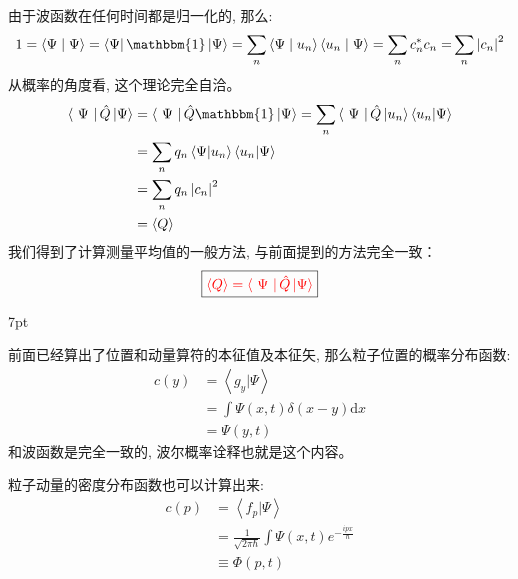 \documentclass[a4paper,zihao=-4,linespread=1]{ctexrep}
\newenvironment{thinknote}{%
\def\FrameCommand{%
\hspace{1pt}%
{\color{BurlyWood}\vrule width 2pt}%
{\color{formalshade}\vrule width 4pt}%
\colorbox{formalshade}%
}%
\MakeFramed{\advance\hsize-\width\FrameRestore}%
\noindent\hspace{-4.55pt}%
\begin{adjustwidth}{}{7pt}%
\vspace{2pt}\vspace{2pt}%
}
{%
\vspace{2pt}\end{adjustwidth}\endMakeFramed%
}
\begin{document}
    由于波函数在任何时间都是归一化的, 那么:
    \begin{equation*}
        1 = \left\langle {\Psi }
    \mathrel{\left | {\vphantom {\Psi  \Psi }}
    \right. \kern-\nulldelimiterspace}
    {\Psi } \right\rangle  = \left\langle \Psi  \right|\mathbbm{1}\left| \Psi  \right\rangle  = \sum\limits_n {\left\langle {\Psi }
    \mathrel{\left | {\vphantom {\Psi  {{u_n}}}}
    \right. \kern-\nulldelimiterspace}
    {{{u_n}}} \right\rangle \left\langle {{{u_n}}}
    \mathrel{\left | {\vphantom {{{u_n}} \Psi }}
    \right. \kern-\nulldelimiterspace}
    {\Psi } \right\rangle }  = \sum\limits_n {c_n^*{c_n} = } \sum\limits_n {{{\left| {{c_n}} \right|}^2}} 
    \end{equation*}
    从概率的角度看, 这个理论完全自洽。
    \begin{align*}
        \left\langle \Psi \right| \hat{Q}  \left| \Psi  \right\rangle & = \left\langle \Psi \right| \hat{Q} \mathbbm{1} \left| \Psi  \right\rangle = \sum_{n} \left\langle \Psi \right| \hat{Q} \left| u_n  \right \rangle\left \langle u_n  | \Psi  \right \rangle \\ 
        &=\sum_{n} q_n\left\langle  \Psi  |u_n  \right\rangle\left \langle u_n  | \Psi  \right \rangle\\
        &=\sum_{n} q_n\left| c_n \right| ^2\\
        &=\left\langle Q \right\rangle 
    \end{align*}
    我们得到了计算测量平均值的一般方法, 与前面提到的方法完全一致：
    \begin{equation}
        \label{eq:3.14}
        \boxed{\color{red}\left\langle Q \right\rangle=\left\langle \Psi \right| \hat{Q}  \left| \Psi  \right\rangle}
    \end{equation}
    \begin{thinknote}
        \setlength\parindent{2em}前面已经算出了位置和动量算符的本征值及本征矢, 那么粒子位置的概率分布函数:
        \begin{align*}
            c\left ( y \right ) & = \left \langle g_y| \Psi  \right \rangle \\& = \int \Psi \left ( x,t \right ) \delta(x-y)\mathrm{d}x
            \\&=\Psi \left ( y,t \right ) 
        \end{align*}
        和波函数是完全一致的, 波尔概率诠释也就是这个内容。

        \setlength\parindent{2em}粒子动量的密度分布函数也可以计算出来:
        \begin{align*}
            c\left ( p \right ) & = \left \langle f_p  | \Psi  \right \rangle \\ & = \frac{1}{\sqrt{2\pi\hbar} } \int  \Psi(x,t)e^{-\frac{ipx}{\hbar } }\\
            &\equiv \Phi(p,t)
        \end{align*}
    \end{thinknote}
\end{document}

